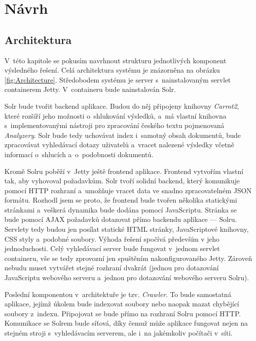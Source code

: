 \chapter{Návrh}
\section{Architektura} \label{arch}
V~této kapitole se pokusím navrhnout strukturu jednotlivých komponent výsledného řešení. Celá architektura systému je znázorněna na obrázku \ref{fig:Architecture}. Středobodem systému je server s~nainstalovaným servlet containerem Jetty. V~containeru bude nainstalován Solr. 

Solr bude tvořit backend aplikace. Budou do něj připojeny knihovny \emph{Carrot2}, které rozšíří jeho možnosti o~shlukování výsledků, a~má vlastní knihovna s~implementovanými nástroji pro zpracování českého textu pojmenovaná \emph{Analyzery}. Solr bude tedy uchovávat index i~samotný obsah dokumentů, bude zpracovávat vyhledávací dotazy uživatelů a~vracet nalezené výsledky včetně informací o~shlucích a~o~podobnosti dokumentů.

Kromě Solru poběží v~Jetty ještě frontend aplikace. Frontend vytvořím vlastní tak, aby vyhovoval požadavkům. Solr tvoří solidní backend, který komunikuje pomocí HTTP rozhraní a~umožňuje vracet data ve snadno zpracovatelném JSON formátu. Rozhodl jsem se proto, že frontend bude tvořen několika statickými stránkami a~veškerá dynamika bude dodána pomocí JavaScriptu. Stránka se bude pomocí AJAX požadavků dotazovat přímo backendu aplikace — Solru. Servlety tedy budou jen posílat statické HTML stránky, JavaScriptové knihovny, CSS styly a~podobné soubory. Výhoda řešení spočívá především v jeho jednoduchosti. Celý vyhledávací server bude fungovat v~jednom servlet containeru, vše se tedy zprovozní jen spuštěním nakonfigurovaného Jetty. Zároveň nebudu muset vytvářet stejné rozhraní dvakrát (jednou pro dotazování JavaScriptu webového serveru a~jednou pro dotazování webového serveru Solru).

Poslední komponentou v~architektuře je tzv. \emph{Crawler}. To bude samostatná aplikace, jejímž úkolem bude indexovat soubory nebo naopak mazat chybějící soubory z~indexu. Připojovat se bude přímo na rozhraní Solru pomocí HTTP. Komunikace se Solrem bude síťová, díky čemuž může aplikace fungovat nejen na stejném stroji s~vyhledávacím serverem, ale i~na jakémkoliv počítači v~síti.

